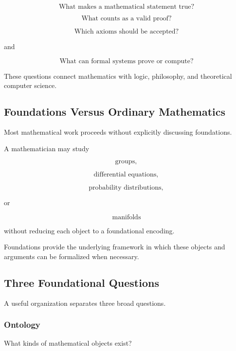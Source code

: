 \[
\boxed{
\text{What makes a mathematical statement true?}
}
\]

\[
\boxed{
\text{What counts as a valid proof?}
}
\]

\[
\boxed{
\text{Which axioms should be accepted?}
}
\]

and

\[
\boxed{
\text{What can formal systems prove or compute?}
}
\]

These questions connect mathematics with logic, philosophy, and theoretical
computer science.

\subsection{Foundations Versus Ordinary Mathematics}
\label{subsec:foundations-versus-practice}

Most mathematical work proceeds without explicitly discussing foundations.

A mathematician may study

\[
\boxed{
\text{groups},
}
\]

\[
\boxed{
\text{differential equations},
}
\]

\[
\boxed{
\text{probability distributions},
}
\]

or

\[
\boxed{
\text{manifolds}
}
\]

without reducing each object to a foundational encoding.

Foundations provide the underlying framework in which these objects and
arguments can be formalized when necessary.

\subsection{Three Foundational Questions}
\label{subsec:three-foundational-questions}

A useful organization separates three broad questions.

\subsubsection{Ontology}

What kinds of mathematical objects exist?

